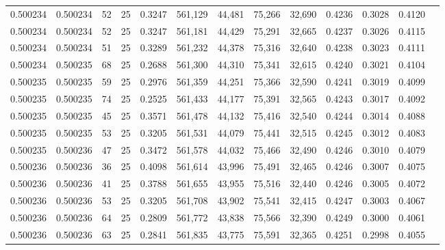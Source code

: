 \begin{tabular}{rrrrrrrrrrrrr}
0.500234 & 0.500234 &    52 &  25 &                                     0.3247 & 561,129 &  44,481 &  75,266 &  32,690 & 0.4236 & 0.3028 & 0.4120 \\
0.500234 & 0.500234 &    52 &  25 &                                     0.3247 & 561,181 &  44,429 &  75,291 &  32,665 & 0.4237 & 0.3026 & 0.4115 \\
0.500234 & 0.500234 &    51 &  25 &                                     0.3289 & 561,232 &  44,378 &  75,316 &  32,640 & 0.4238 & 0.3023 & 0.4111 \\
0.500234 & 0.500235 &    68 &  25 &                                     0.2688 & 561,300 &  44,310 &  75,341 &  32,615 & 0.4240 & 0.3021 & 0.4104 \\
0.500235 & 0.500235 &    59 &  25 &                                     0.2976 & 561,359 &  44,251 &  75,366 &  32,590 & 0.4241 & 0.3019 & 0.4099 \\
0.500235 & 0.500235 &    74 &  25 &                                     0.2525 & 561,433 &  44,177 &  75,391 &  32,565 & 0.4243 & 0.3017 & 0.4092 \\
0.500235 & 0.500235 &    45 &  25 &                                     0.3571 & 561,478 &  44,132 &  75,416 &  32,540 & 0.4244 & 0.3014 & 0.4088 \\
0.500235 & 0.500235 &    53 &  25 &                                     0.3205 & 561,531 &  44,079 &  75,441 &  32,515 & 0.4245 & 0.3012 & 0.4083 \\
0.500235 & 0.500236 &    47 &  25 &                                     0.3472 & 561,578 &  44,032 &  75,466 &  32,490 & 0.4246 & 0.3010 & 0.4079 \\
0.500236 & 0.500236 &    36 &  25 &                                     0.4098 & 561,614 &  43,996 &  75,491 &  32,465 & 0.4246 & 0.3007 & 0.4075 \\
0.500236 & 0.500236 &    41 &  25 &                                     0.3788 & 561,655 &  43,955 &  75,516 &  32,440 & 0.4246 & 0.3005 & 0.4072 \\
0.500236 & 0.500236 &    53 &  25 &                                     0.3205 & 561,708 &  43,902 &  75,541 &  32,415 & 0.4247 & 0.3003 & 0.4067 \\
0.500236 & 0.500236 &    64 &  25 &                                     0.2809 & 561,772 &  43,838 &  75,566 &  32,390 & 0.4249 & 0.3000 & 0.4061 \\
0.500236 & 0.500236 &    63 &  25 &                                     0.2841 & 561,835 &  43,775 &  75,591 &  32,365 & 0.4251 & 0.2998 & 0.4055 \\

\end{tabular}
